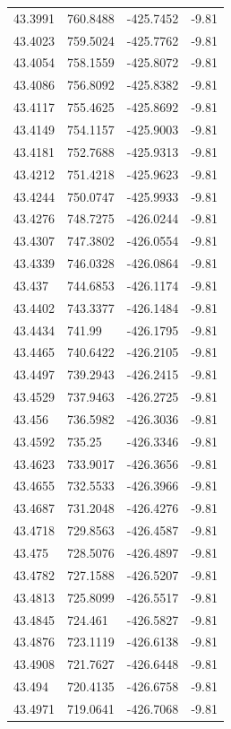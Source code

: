 \begin{table}[H]
\begin{tabular}{llll}
43.3991 & 760.8488 & -425.7452 & -9.81 \\
43.4023 & 759.5024 & -425.7762 & -9.81 \\
43.4054 & 758.1559 & -425.8072 & -9.81 \\
43.4086 & 756.8092 & -425.8382 & -9.81 \\
43.4117 & 755.4625 & -425.8692 & -9.81 \\
43.4149 & 754.1157 & -425.9003 & -9.81 \\
43.4181 & 752.7688 & -425.9313 & -9.81 \\
43.4212 & 751.4218 & -425.9623 & -9.81 \\
43.4244 & 750.0747 & -425.9933 & -9.81 \\
43.4276 & 748.7275 & -426.0244 & -9.81 \\
43.4307 & 747.3802 & -426.0554 & -9.81 \\
43.4339 & 746.0328 & -426.0864 & -9.81 \\
43.437 & 744.6853 & -426.1174 & -9.81 \\
43.4402 & 743.3377 & -426.1484 & -9.81 \\
43.4434 & 741.99 & -426.1795 & -9.81 \\
43.4465 & 740.6422 & -426.2105 & -9.81 \\
43.4497 & 739.2943 & -426.2415 & -9.81 \\
43.4529 & 737.9463 & -426.2725 & -9.81 \\
43.456 & 736.5982 & -426.3036 & -9.81 \\
43.4592 & 735.25 & -426.3346 & -9.81 \\
43.4623 & 733.9017 & -426.3656 & -9.81 \\
43.4655 & 732.5533 & -426.3966 & -9.81 \\
43.4687 & 731.2048 & -426.4276 & -9.81 \\
43.4718 & 729.8563 & -426.4587 & -9.81 \\
43.475 & 728.5076 & -426.4897 & -9.81 \\
43.4782 & 727.1588 & -426.5207 & -9.81 \\
43.4813 & 725.8099 & -426.5517 & -9.81 \\
43.4845 & 724.461 & -426.5827 & -9.81 \\
43.4876 & 723.1119 & -426.6138 & -9.81 \\
43.4908 & 721.7627 & -426.6448 & -9.81 \\
43.494 & 720.4135 & -426.6758 & -9.81 \\
43.4971 & 719.0641 & -426.7068 & -9.81 \\

\end{tabular}
\end{table}
